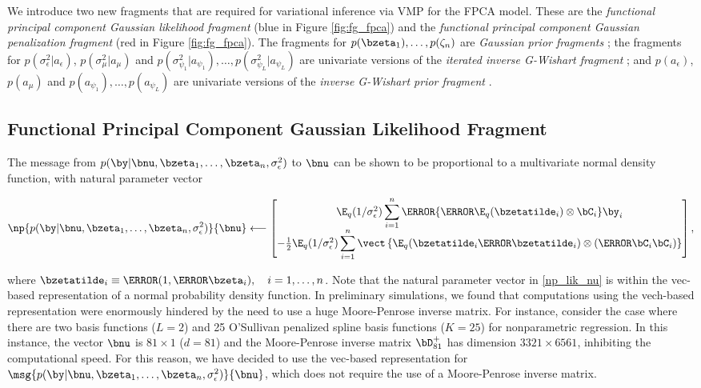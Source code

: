 \documentclass[12pt]{article}
\def\sigsqeps{\sigma^2_{\epsilon}}
\def\aeps{a_{\epsilon}}
\def\sigsqmu{\sigma^2_{\mu}}
\def\amu{a_{\mu}}
\newcommand\sigsqpsi[1]{\sigma^2_{\psi_{#1}}}
\newcommand\apsi[1]{a_{\psi_{#1}}}
\theoremstyle{plain}
\theoremstyle{definition}
\theoremstyle{remark}
\begin{document}
We introduce two new fragments that are required for variational inference via VMP for the FPCA model. These
are the \emph{functional principal component Gaussian likelihood fragment} (blue in Figure \ref{fig:fg_fpca})
and the \emph{functional principal component Gaussian penalization fragment} (red in Figure \ref{fig:fg_fpca}).
The fragments for $p (\bzeta_1), \dots, p (\zeta_n)$ are \emph{Gaussian prior fragments}
\cite[Section~4.1.1]{wand17}; the fragments for $p (\sigsqeps | \aeps)$, $p (\sigsqmu | \amu)$ and
$p (\sigsqpsi{1} | \apsi{1}), \dots, p (\sigsqpsi{L} | \apsi{L})$ are univariate versions of the \emph{iterated inverse
G-Wishart fragment} \cite[Algorithm~2]{maestrini20}; and $p (\aeps)$, $p (\amu)$ and $p (\apsi{1}), \dots, p (\apsi{L})$
are univariate versions of the \emph{inverse G-Wishart prior fragment} \cite[Algorithm~1]{maestrini20}.


\subsection{Functional Principal Component Gaussian Likelihood Fragment}
\label{sec:fpca_gauss_lik_frag}

The message from $p (\by | \bnu, \bzeta_1, \dots, \bzeta_n, \sigsqeps)$ to $\bnu$ can be shown to be
proportional to a multivariate normal density function, with natural parameter vector

\begin{equation}
	\np{p (\by | \bnu, \bzeta_1, \dots, \bzeta_n, \sigsqeps)}{\bnu}
		\longleftarrow
			\begin{bmatrix}
				\E_q (1/\sigsqeps) \displaystyle\sum_{i=1}^n \T{\left\{
					\T{\E_q (\bzetatilde_i)} \otimes \bC_i
				\right\}} \by_i \\
				-\frac12 \E_q (1/\sigsqeps) \displaystyle\sum_{i=1}^n \vect \left\{
					\E_q (\bzetatilde_i \T{\bzetatilde_i}) \otimes (\T{\bC_i} \bC_i)
				\right\}
			\end{bmatrix},
\label{np_lik_nu}
\end{equation}

\noindent where $\bzetatilde_i \equiv \T{(1, \T{\bzeta_i})}, \quad i = 1, \dots, n$. Note that the natural
parameter vector in \eqref{np_lik_nu} is within the vec-based representation of a normal probability density function.
In preliminary simulations, we found that computations using the vech-based representation were enormously hindered
by the need to use a huge Moore-Penrose inverse matrix. For instance, consider the case where
there are two basis functions ($L = 2$) and 25 O'Sullivan penalized spline basis functions ($K = 25$) for nonparametric
regression. In this instance, the vector $\bnu$ is $81 \times 1$ ($d = 81$) and the Moore-Penrose inverse matrix
$\bD_{81}^+$ has dimension $3321 \times 6561$, inhibiting the computational speed. For this reason, we have
decided to use the vec-based representation for $\msg{p (\by | \bnu, \bzeta_1, \dots, \bzeta_n, \sigsqeps)}{\bnu}$,
which does not require the
use of a Moore-Penrose inverse matrix.
\end{document}
